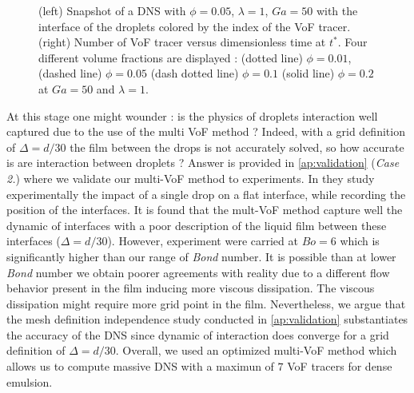 \begin{figure}[h!]
\begin{tikzpicture}
    \end{tikzpicture}
    \caption{
    (left) Snapshot of a DNS with $\phi = 0.05$, $\lambda = 1$, $Ga = 50$ with the interface of the droplets colored by the index of the VoF tracer.
    (right) Number of VoF tracer versus dimensionless time  at $t^*$.
    Four different volume fractions are displayed : (dotted line) $\phi = 0.01$, (dashed line) $\phi = 0.05$ (dash dotted line) $\phi = 0.1$ (solid line) $\phi = 0.2$ at $Ga = 50$ and $\lambda = 1$. 
    }
    \label{fig:diagram}
\end{figure}





At this stage one might wounder : is the physics of droplets interaction well captured due to the use of the multi VoF method ?
Indeed, with a grid definition of $\Delta = d/30$ the film between the drops is not accurately solved, so how accurate is are interaction between droplets ?
Answer is  provided in \ref{ap:validation} (\textit{Case 2.}) where we validate our multi-VoF method to \citet{mohamed2003drop} experiments.
In \citet{mohamed2003drop} they study experimentally the impact of a single drop on a flat interface, while recording the position of the interfaces. 
It is found that the mult-VoF method capture well the dynamic of interfaces with a poor description of the liquid film between these interfaces ($\Delta = d/30$). 
However,  \citet{mohamed2003drop} experiment were carried at $Bo = 6$ which is significantly higher than our range of \textit{Bond} number. 
It is possible than at lower \textit{Bond} number we obtain poorer agreements with reality due to a different flow behavior present in the film inducing more viscous dissipation.
The viscous dissipation might require more grid point in the film. 
Nevertheless, we argue that the mesh definition independence study conducted in \ref{ap:validation} substantiates the accuracy of the DNS since dynamic of interaction does converge for a grid definition of $\Delta = d/30$. 
Overall, we used an optimized multi-VoF method which allows us to compute massive DNS with a maximun of $7$ VoF tracers for dense emulsion.
 





